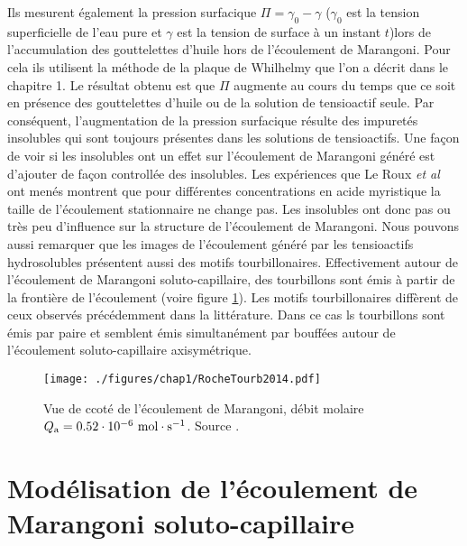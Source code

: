 Ils mesurent également la pression surfacique $\Pi = \gamma_0 -\gamma$ ($\gamma_0$ est la tension superficielle de l'eau pure et $\gamma$ est la tension de surface à un instant $t$)lors de l'accumulation des gouttelettes d'huile hors de l'écoulement de Marangoni. Pour cela ils utilisent la méthode de la plaque de Whilhelmy que l'on a décrit dans le chapitre 1. Le résultat obtenu est que $\Pi$ augmente au cours du temps que ce soit en présence des gouttelettes d'huile ou de la solution de tensioactif seule. Par conséquent, l'augmentation de la pression surfacique résulte des impuretés insolubles qui sont toujours présentes dans les solutions de tensioactifs. Une façon de voir si les insolubles ont un effet sur l'écoulement de Marangoni généré est d'ajouter de façon controllée des insolubles. Les expériences que Le Roux \textit{et al} ont menés montrent que pour différentes concentrations en acide myristique la taille de l'écoulement stationnaire ne change pas. Les insolubles ont donc pas ou très peu d'influence sur la structure de l'écoulement de Marangoni. Nous pouvons aussi remarquer que les images de l'écoulement généré par les tensioactifs hydrosolubles présentent aussi des motifs tourbillonaires. Effectivement autour de l'écoulement de Marangoni soluto-capillaire, des tourbillons sont émis à partir de la frontière de l'écoulement (voire figure \ref{fig:Roche2014Tourb}). Les motifs tourbillonaires diffèrent de ceux observés précédemment dans la littérature. Dans ce cas ls tourbillons sont émis par paire et semblent émis simultanément par bouffées autour de l'écoulement soluto-capillaire axisymétrique. 
\begin{figure}[!ht]
  \centering
  \texttt{[image: ./figures/chap1/RocheTourb2014.pdf]}
  \caption{Vue de ccoté de l'écoulement de Marangoni, débit molaire $Q_{\rm a } = 0.52\cdot 10^{-6}~\rm mol\cdot s^{-1}$. Source \cite{Roche2014}.}
  \label{fig:Roche2014Tourb}
\end{figure}

\section{Modélisation de l'écoulement de Marangoni soluto-capillaire}

